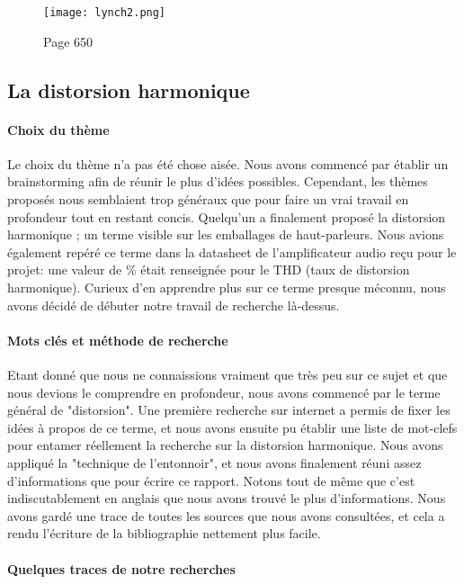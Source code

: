 \begin{figure}[!htb]
	\centering
	\texttt{[image: lynch2.png]}
	\caption{Page 650}
	\label{lynch2}
\end{figure}

\subsection{La distorsion harmonique}

\paragraph{Choix du thème}
Le choix du thème n'a pas été chose aisée. Nous avons commencé par établir un brainstorming afin de réunir 
le plus d'idées possibles. Cependant, les thèmes proposés nous semblaient trop généraux que pour faire un vrai 
travail en profondeur tout en restant concis. Quelqu'un a finalement proposé la distorsion harmonique ; un 
terme visible sur les emballages de haut-parleurs. Nous avions également repéré ce terme dans la datasheet 
de l'amplificateur audio reçu pour le projet: une valeur de \% était renseignée pour le THD 
(taux de distorsion harmonique). Curieux d'en apprendre plus sur ce terme presque méconnu, 
nous avons décidé de débuter notre travail de recherche là-dessus.

\paragraph{Mots clés et méthode de recherche}
Etant donné que nous ne connaissions vraiment que très peu sur ce sujet et que nous 
devions le comprendre en profondeur, nous avons commencé par le terme général de "distorsion".
Une première recherche sur internet a permis de fixer les idées à propos de ce terme, et nous 
avons ensuite pu établir une liste de mot-clefs pour entamer réellement la recherche sur la 
distorsion harmonique. Nous avons appliqué la "technique de l'entonnoir", et nous avons finalement 
réuni assez d'informations que pour écrire ce rapport. Notons tout de même que c'est indiscutablement
en anglais que nous avons 
trouvé le plus d'informations. Nous avons gardé une trace de toutes les sources que nous avons 
consultées, et cela a rendu l'écriture de la bibliographie nettement plus facile.

\paragraph{Quelques traces de notre recherches}

